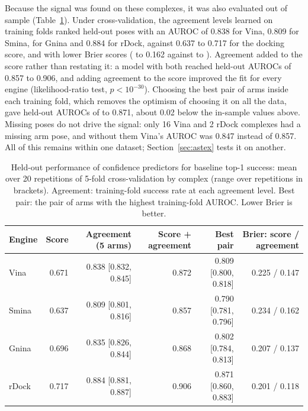 Because the signal was found on these complexes, it was also evaluated out of sample
(Table~\ref{tab:agreement-cv}). Under cross-validation, the agreement levels learned on
training folds ranked held-out poses with an AUROC of 0.838 for Vina, 0.809 for Smina, 
for Gnina and 0.884 for rDock, against 0.637 to 0.717 for the docking score, and with lower
Brier scores ( to 0.162 against  to ). Agreement added to the score rather
than restating it: a model with both reached held-out AUROCs of 0.857 to 0.906, and adding
agreement to the score improved the fit for every engine (likelihood-ratio test, $p <
10^{-30}$). Choosing the best pair of arms inside each training fold, which removes the
optimism of choosing it on all the data, gave held-out AUROCs of  to 0.871, about 0.02
below the in-sample values above. Missing poses do not drive the signal: only 16 Vina and 2
rDock complexes had a missing arm pose, and without them Vina's AUROC was 0.847 instead of
0.857. All of this remains within one dataset; Section~\ref{sec:astex} tests it on another.

\begin{table}[h]
  \centering
  \caption{Held-out performance of confidence predictors for baseline top-1 success: mean
    over 20 repetitions of 5-fold cross-validation by complex (range over repetitions in
    brackets). Agreement: training-fold success rate at each agreement level. Best pair:
    the pair of arms with the highest training-fold AUROC. Lower Brier is better.}
  \label{tab:agreement-cv}
  \small
  \setlength{\tabcolsep}{4pt}
  \begin{tabular}{lrrrrr}
    \toprule
    Engine & Score & Agreement (5 arms) & Score + agreement & Best pair & Brier: score / agreement \\
    \midrule
    Vina & 0.671 & 0.838 [0.832, 0.845] & 0.872 & 0.809 [0.800, 0.818] & 0.225 / 0.147 \\
    Smina & 0.637 & 0.809 [0.801, 0.816] & 0.857 & 0.790 [0.781, 0.796] & 0.234 / 0.162 \\
    Gnina & 0.696 & 0.835 [0.826, 0.844] & 0.868 & 0.802 [0.784, 0.813] & 0.207 / 0.137 \\
    rDock & 0.717 & 0.884 [0.881, 0.887] & 0.906 & 0.871 [0.860, 0.883] & 0.201 / 0.118 \\
    \bottomrule
  \end{tabular}
\end{table}

